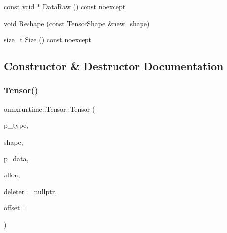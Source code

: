 \begin{DoxyCompactItemize}
const \mbox{\hyperlink{mlasi_8h_a88f941d423cb2a819b70a1358982b1a6}{void}} $\ast$ \mbox{\hyperlink{classonnxruntime_1_1Tensor_a13d387f046da54820c6014e9e73b0da6}{Data\+Raw}} () const noexcept
\item 
\mbox{\hyperlink{mlasi_8h_a88f941d423cb2a819b70a1358982b1a6}{void}} \mbox{\hyperlink{classonnxruntime_1_1Tensor_a4088f3950586c511377f1904b2e44a3f}{Reshape}} (const \mbox{\hyperlink{classonnxruntime_1_1TensorShape}{Tensor\+Shape}} \&new\+\_\+shape)
\item 
\mbox{\hyperlink{mlasi_8h_a503efbc1c6e50825320ad909366b78ab}{size\+\_\+t}} \mbox{\hyperlink{classonnxruntime_1_1Tensor_aad4466a12c085d4f49bfa099c02a13c3}{Size}} () const noexcept
\end{DoxyCompactItemize}


\subsection{Constructor \& Destructor Documentation}
\mbox{\label{classonnxruntime_1_1Tensor_aa4a6341d3df270e20756ad36b2e4dd32}} 
\subsubsection{\texorpdfstring{Tensor()}{Tensor()}\hspace{0.1cm}{\footnotesize\ttfamily [1/3]}}
{\footnotesize\ttfamily onnxruntime\+::\+Tensor\+::\+Tensor (\begin{DoxyParamCaption}\item[{\mbox{\hyperlink{namespaceonnxruntime_ad77d0a6e838ec7da5dc35fed5ee66b49}{M\+L\+Data\+Type}}}]{p\+\_\+type,  }\item[{const \mbox{\hyperlink{classonnxruntime_1_1TensorShape}{Tensor\+Shape}} \&}]{shape,  }\item[{\mbox{\hyperlink{namespaceonnxruntime_a1077ff17fe9e6d571cea3082b9e3a22b}{Buffer\+Naked\+Ptr}}}]{p\+\_\+data,  }\item[{const \mbox{\hyperlink{structONNXRuntimeAllocatorInfo}{O\+N\+N\+X\+Runtime\+Allocator\+Info}} \&}]{alloc,  }\item[{\mbox{\hyperlink{namespaceonnxruntime_a6cdac724c5dcefded3a63f08dae58fda}{Allocator\+Ptr}}}]{deleter = {\ttfamily nullptr},  }\item[{int64\+\_\+t}]{offset = {} }\end{DoxyParamCaption})}

